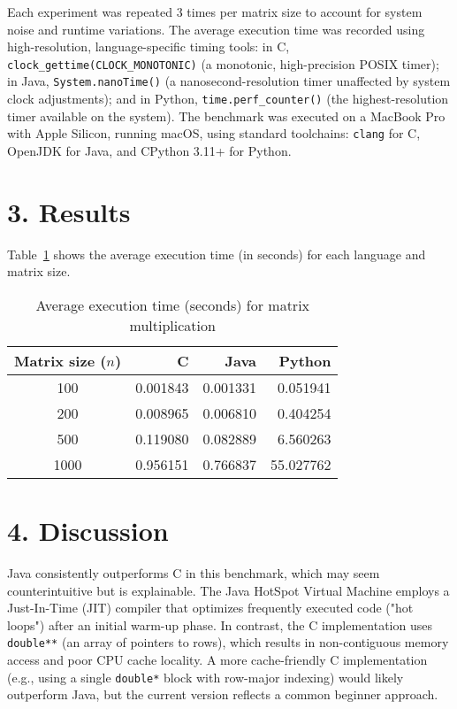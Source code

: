 \documentclass[12pt]{article}
\begin{document}
Each experiment was repeated 3 times per matrix size to account for system noise and runtime variations. The average execution time was recorded using high-resolution, language-specific timing tools: in C, \texttt{clock\_gettime(CLOCK\_MONOTONIC)} (a monotonic, high-precision POSIX timer); in Java, \texttt{System.nanoTime()} (a nanosecond-resolution timer unaffected by system clock adjustments); and in Python, \texttt{time.perf\_counter()} (the highest-resolution timer available on the system). The benchmark was executed on a MacBook Pro with Apple Silicon, running macOS, using standard toolchains: \texttt{clang} for C, OpenJDK for Java, and CPython 3.11+ for Python.

\section*{3. Results}
Table~\ref{tab:results} shows the average execution time (in seconds) for each language and matrix size.

\begin{table}[h]
\centering
\caption{Average execution time (seconds) for matrix multiplication}
\label{tab:results}
\begin{tabular}{crrr}
\toprule
Matrix size ($n$) & C & Java & Python \\
\midrule
100 & 0.001843 & 0.001331 & 0.051941 \\
200 & 0.008965 & 0.006810 & 0.404254 \\
500 & 0.119080 & 0.082889 & 6.560263 \\
1000 & 0.956151 & 0.766837 & 55.027762 \\
\bottomrule
\end{tabular}
\end{table}

\section*{4. Discussion}
Java consistently outperforms C in this benchmark, which may seem counterintuitive but is explainable. The Java HotSpot Virtual Machine employs a Just-In-Time (JIT) compiler that optimizes frequently executed code ("hot loops") after an initial warm-up phase. In contrast, the C implementation uses \texttt{double**} (an array of pointers to rows), which results in non-contiguous memory access and poor CPU cache locality. A more cache-friendly C implementation (e.g., using a single \texttt{double*} block with row-major indexing) would likely outperform Java, but the current version reflects a common beginner approach.
\end{document}
